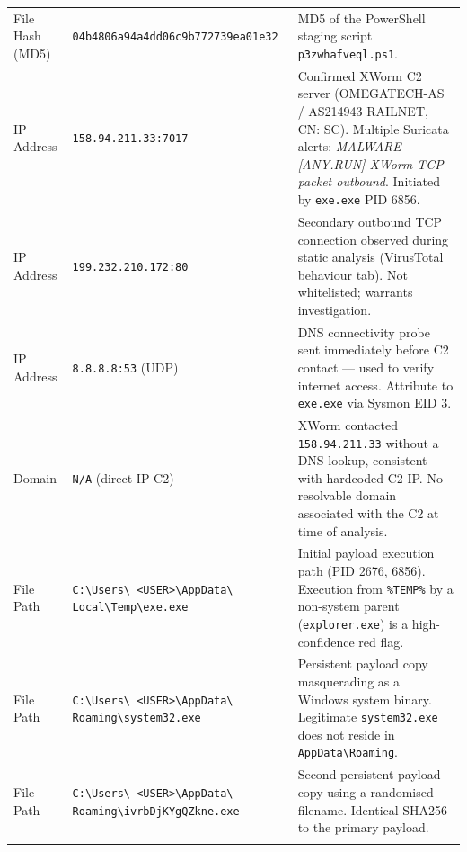 \documentclass[10pt]{article}
\begin{document}
\begin{longtable}{p{2.8cm} p{6.8cm} p{5.0cm}}
File Hash (MD5)
  & \texttt{\small 04b4806a94a4dd06c9b772739ea01e32}
  & MD5 of the PowerShell staging script
    \texttt{p3zwhafveql.ps1}. \\
\addlinespace
 
IP Address
  & \texttt{158.94.211.33:7017}
  & Confirmed XWorm C2 server (OMEGATECH-AS / AS214943
    RAILNET, CN: SC). Multiple Suricata alerts:
    \textit{MALWARE [ANY.RUN] XWorm TCP packet outbound}.
    Initiated by \texttt{exe.exe} PID 6856. \\
\addlinespace
 
IP Address
  & \texttt{199.232.210.172:80}
  & Secondary outbound TCP connection observed during
    static analysis (VirusTotal behaviour tab).
    Not whitelisted; warrants investigation. \\
\addlinespace
 
IP Address
  & \texttt{8.8.8.8:53} (UDP)
  & DNS connectivity probe sent immediately before C2
    contact — used to verify internet access.
    Attribute to \texttt{exe.exe} via Sysmon EID 3. \\
\addlinespace
 
Domain
  & \texttt{N/A} (direct-IP C2)
  & XWorm contacted \texttt{158.94.211.33} without a
    DNS lookup, consistent with hardcoded C2 IP.
    No resolvable domain associated with the C2 at
    time of analysis. \\
\addlinespace
 
File Path
  & \scriptsize{\texttt{C:\textbackslash Users\textbackslash
    <USER>\textbackslash AppData\textbackslash
    Local\textbackslash Temp\textbackslash exe.exe}}
  & Initial payload execution path (PID 2676, 6856).
    Execution from \texttt{\%TEMP\%} by a non-system
    parent (\texttt{explorer.exe}) is a high-confidence
    red flag. \\
\addlinespace
 
File Path
  & \scriptsize{\texttt{C:\textbackslash Users\textbackslash
    <USER>\textbackslash AppData\textbackslash
    Roaming\textbackslash system32.exe}}
  & Persistent payload copy masquerading as a Windows
    system binary. Legitimate \texttt{system32.exe}
    does not reside in \texttt{AppData\textbackslash Roaming}. \\
\addlinespace
 
File Path
  & \scriptsize{\texttt{C:\textbackslash Users\textbackslash
    <USER>\textbackslash AppData\textbackslash
    Roaming\textbackslash ivrbDjKYgQZkne.exe}}
  & Second persistent payload copy using a randomised
    filename. Identical SHA256 to the primary payload. \\
\addlinespace
 

\end{longtable}
\end{document}
